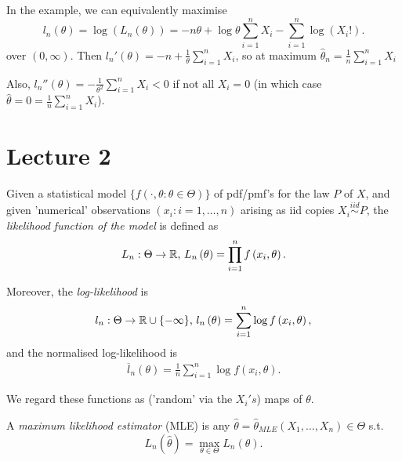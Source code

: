 \documentclass[a4paper]{article}
\begin{document}
In the example, we can equivalently maximise 
\[
	l_{n}\left( \theta \right) = \log\left( L_{n}\left( \theta \right)  \right) = -n\theta + \log\theta \sum_{i=1}^{n} X_{i}  - \sum_{i=1}^{n} \log\left( X_{i}! \right)
.\]
over $(0, \infty)$. Then  $l_{n}'\left( \theta \right) = -n + \frac{1}{\theta}\sum_{i=1}^{n} X_{i}$, so at maximum $\hat{\theta}_{n} = \frac{1}{n} \sum_{i=1}^{n} X_{i}$

Also, $l_{n}''\left( \theta \right) = - \frac{1}{\theta ^2} \sum_{i=1}^{n} X_{i} < 0$ if not all $X_{i} = 0$ (in which case $\hat{\theta} = 0 = \frac{1}{n} \sum_{i=1}^{n} X_{i}$).

\newpage

\section*{Lecture 2}

\begin{defn}
	Given a statistical model $\{f\left( \cdot , \theta : \theta \in \Theta \right) \} $ of pdf/pmf's for the law $P$ of $X$, and given 'numerical' observations  $\left( x_{i}: i=1,\ldots,n \right) $ arising as iid copies $X_{i}\stackrel{iid}{\sim}P$, the \textit{likelihood function of the model} is defined as
	\begin{align*}
		L_{n} : \Theta \to \mathbb{R} \text{, } L_{n}\left( \theta \right) = \prod_{i=1}^{n} f\left( x_{i}, \theta \right)   
	.\end{align*}

Moreover, the \textit{log-likelihood} is
\begin{align*}
	l_{n}: \Theta \to \mathbb{R} \cup \{-\infty\} \text{, } l_{n}\left( \theta \right) = \sum_{i=1}^{n}\log f\left( x_{i}, \theta \right)
,\end{align*}
and the normalised log-likelihood is
\begin{align*}
	\overline{l}_{n}\left( \theta \right) = \frac{1}{n}\sum_{i=1}^{n}\log f\left( x_{i}, \theta \right) 
.\end{align*}
\end{defn}
We regard these functions as ('random' via the $X_{i}'s$) maps of $\theta$.

\begin{defn}
	A \textit{maximum likelihood estimator} (MLE) is any $\hat{\theta} = \hat{\theta}_{MLE} \left( X_{1}, \ldots, X_{n} \right) \in \Theta$ s.t. \[
		L_{n}( \hat{\theta}) = \max_{\theta \in \Theta} L_{n}\left( \theta \right) 
	.\] 
\end{defn}
\end{document}
